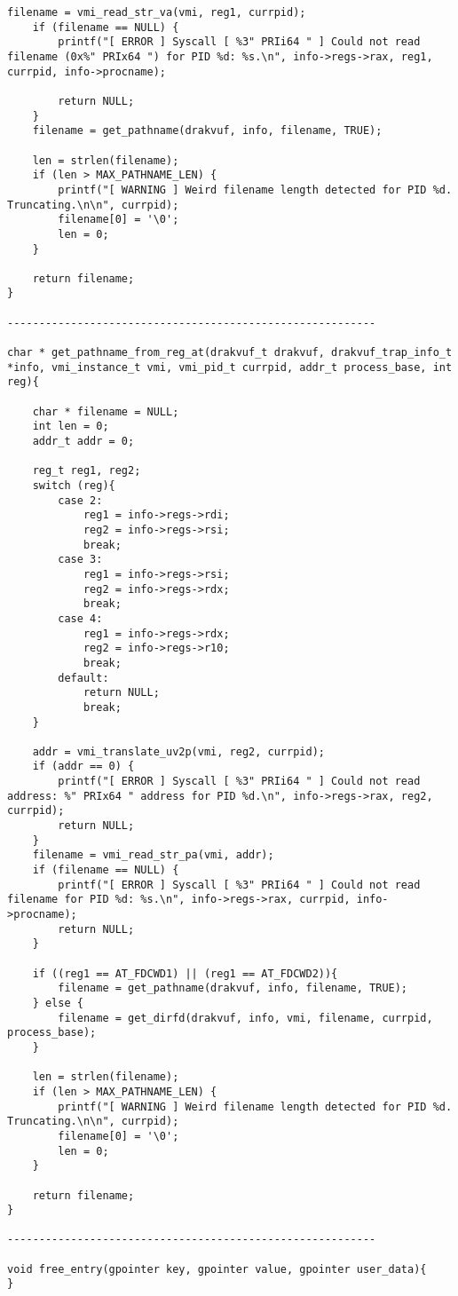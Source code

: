 {\begin{lstlisting}[style=CStyle]
	filename = vmi_read_str_va(vmi, reg1, currpid);
	if (filename == NULL) {
		printf("[ ERROR ] Syscall [ %3" PRIi64 " ] Could not read filename (0x%" PRIx64 ") for PID %d: %s.\n", info->regs->rax, reg1, currpid, info->procname);

		return NULL;
	}
	filename = get_pathname(drakvuf, info, filename, TRUE);
	
	len = strlen(filename);
	if (len > MAX_PATHNAME_LEN) {
		printf("[ WARNING ] Weird filename length detected for PID %d. Truncating.\n\n", currpid);
		filename[0] = '\0';
		len = 0;
	}
		
	return filename;
}

----------------------------------------------------------

char * get_pathname_from_reg_at(drakvuf_t drakvuf, drakvuf_trap_info_t *info, vmi_instance_t vmi, vmi_pid_t currpid, addr_t process_base, int reg){

	char * filename = NULL;
	int len = 0;
	addr_t addr = 0;
	
	reg_t reg1, reg2;
	switch (reg){
		case 2:
			reg1 = info->regs->rdi;
			reg2 = info->regs->rsi;
			break;
		case 3:
			reg1 = info->regs->rsi;
			reg2 = info->regs->rdx;
			break;
		case 4:
			reg1 = info->regs->rdx;
			reg2 = info->regs->r10;
			break;
		default:
			return NULL;
			break;
	}
		
	addr = vmi_translate_uv2p(vmi, reg2, currpid);
	if (addr == 0) {
		printf("[ ERROR ] Syscall [ %3" PRIi64 " ] Could not read address: %" PRIx64 " address for PID %d.\n", info->regs->rax, reg2, currpid);
		return NULL;
	}
	filename = vmi_read_str_pa(vmi, addr);
	if (filename == NULL) {
		printf("[ ERROR ] Syscall [ %3" PRIi64 " ] Could not read filename for PID %d: %s.\n", info->regs->rax, currpid, info->procname);
		return NULL;
	}
	
	if ((reg1 == AT_FDCWD1) || (reg1 == AT_FDCWD2)){
		filename = get_pathname(drakvuf, info, filename, TRUE);
	} else {
		filename = get_dirfd(drakvuf, info, vmi, filename, currpid, process_base);	
	}
	
	len = strlen(filename);
	if (len > MAX_PATHNAME_LEN) {
		printf("[ WARNING ] Weird filename length detected for PID %d. Truncating.\n\n", currpid);
		filename[0] = '\0';
		len = 0;
	}
	
	return filename;
}

----------------------------------------------------------

void free_entry(gpointer key, gpointer value, gpointer user_data){
}

\end{lstlisting}}	
